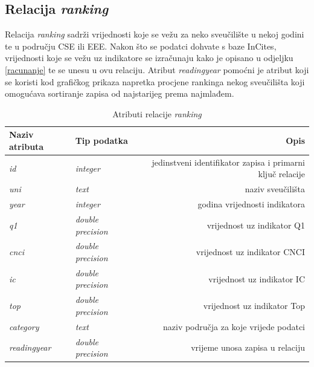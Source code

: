 \documentclass[times, utf8, zavrsni]{fer}
\begin{document}
\subsection{Relacija \emph{ranking}}
Relacija \emph{ranking} sadrži vrijednosti koje se vežu za neko sveučilište u nekoj godini te u području CSE ili EEE. 
Nakon što se podatci dohvate s baze InCites, vrijednosti koje se vežu uz indikatore se izračunaju kako je opisano u odjeljku \ref{racunanje} 
te se unesu u ovu relaciju. Atribut \emph{readingyear} pomoćni je atribut koji se koristi kod grafičkog prikaza napretka procjene rankinga 
nekog sveučilišta koji omogućava sortiranje zapisa od najstarijeg prema najmlađem.
\begin{table}[htb]
    \caption{Atributi relacije \emph{ranking}}
        \label{tbl:ranking}
        \centering
        \begin{tabular}{llr} \hline
        Naziv atributa & Tip podatka & Opis\\ \hline
        \emph{id} &  \emph{integer} & jedinstveni identifikator zapisa i primarni ključ relacije\\
        \emph{uni} &  \emph{text} & naziv sveučilišta\\
        \emph{year} &  \emph{integer} & godina vrijednosti indikatora\\
        \emph{q1} &  \emph{double precision} & vrijednost uz indikator Q1\\
        \emph{cnci} &  \emph{double precision} & vrijednost uz indikator CNCI\\
        \emph{ic} &  \emph{double precision} & vrijednost uz indikator IC\\
        \emph{top} &  \emph{double precision} & vrijednost uz indikator Top\\
        \emph{category} &  \emph{text} & naziv područja za koje vrijede podatci\\
        \emph{readingyear} &  \emph{double precision} & vrijeme unosa zapisa u relaciju\\
        \end{tabular}
        \end{table}    
        \FloatBarrier 
\end{document}
